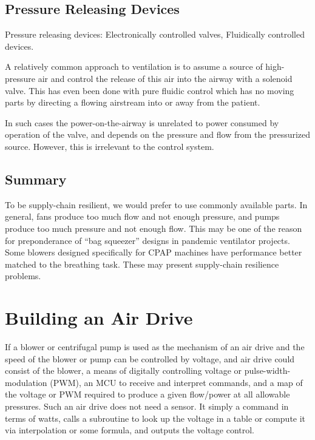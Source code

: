 \documentclass[conference]{article}
\begin{document}
\subsection{Pressure Releasing Devices}

\begin{outline}
  \1 Pressure releasing devices:
  \2 Electronically controlled valves,
  \2 Fluidically controlled devices.
\end{outline}

A relatively common approach to ventilation is to assume a source of high-pressure air and control the release of this air
into the airway with a solenoid valve. This has even been done with pure fluidic control which has no moving parts
by directing a flowing airstream into or away from the patient.

In such cases the power-on-the-airway is unrelated to power consumed by operation of the valve, and
depends on the pressure and flow from the pressurized source. However, this is irrelevant to the control system.

\subsection{Summary}

To be supply-chain resilient, we would prefer to use commonly available parts.
In general, fans produce too much flow and not enough pressure, and pumps produce too much pressure and not enough flow.
This may be one of the reason for preponderance of ``bag squeezer'' designs in pandemic ventilator projects.
Some blowers designed specifically for CPAP machines have performance better matched to the breathing task.
These may present supply-chain resilience problems.


\section{Building an Air Drive}

If a blower or centrifugal pump is used as the mechanism of an air drive and the speed of the
blower or pump can be controlled by voltage, and air drive could consist of the blower,
a means of digitally controlling voltage or pulse-width-modulation (PWM), an MCU to receive and interpret commands, and
a map of the voltage  or PWM required to produce a given flow/power at all allowable pressures.
Such an air drive does not need a sensor.
It simply a command in terms of watts, calls a subroutine to look up the voltage in a table
or compute it via interpolation or some formula, and outputs the voltage control.
\end{document}
